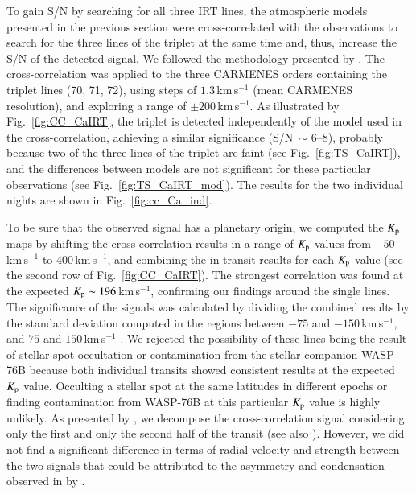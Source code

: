 \documentclass{aa}
\begin{document}
To gain S/N by searching for all three  IRT lines, the atmospheric models presented in the previous section were cross-correlated with the observations to search for the three lines of the  triplet at the same time and, thus, increase the S/N of the detected signal. We followed the methodology presented by \citet{Stangret2020}. The cross-correlation was applied to the three CARMENES orders containing the  triplet lines (70, 71, 72), using steps of $1.3$\,km\,s$^{-1}$ (mean CARMENES resolution), and exploring a range of $\pm200$\,km\,s$^{-1}$. As illustrated by Fig.~\ref{fig:CC_CaIRT}, %
the  triplet is detected independently of the model used in the cross-correlation, achieving a similar significance (S/N~$\sim$ 6--8), probably because two of the three lines of the triplet are faint (see Fig.~\ref{fig:TS_CaIRT}), and the differences between models are not significant for these particular observations (see Fig.~\ref{fig:TS_CaIRT_mod}). The results for the two individual nights are shown in Fig.~\ref{fig:cc_Ca_ind}. 

To be sure that the observed signal has a planetary origin, we computed the $K_{\rm p}$ maps by shifting the cross-correlation results in a range of $K_{\rm p}$ values from $-50$\,km\,s$^{-1}$ to $400$\,km\,s$^{-1}$, and combining the in-transit results for each $K_{\rm p}$ value (see the second row of Fig.~\ref{fig:CC_CaIRT}). The strongest correlation was found at the expected $K_{\rm p} \sim 196$\,km\,s$^{-1}$, confirming our findings around the single lines. The significance of the signals was calculated by dividing the combined results by the standard deviation computed in the regions between $-75$ and $-150$\,km\,s$^{-1}$, and $75$ and $150$\,km\,s$^{-1}$ \citep{birkby2017,SanchezLopez2019}. We rejected the possibility of these lines being the result of stellar spot occultation or contamination from the stellar companion WASP-76B because both individual transits showed consistent results at the expected $K_{\rm p}$ value. Occulting a stellar spot at the same latitudes in different epochs or finding contamination from WASP-76B at this particular $K_{\rm p}$ value is highly unlikely. As presented by \citet{Kesseli2021}, we decompose the  cross-correlation signal considering only the first and only the second half of the transit (see also \citealt{Wardenier2021}). However, we did not find a significant difference in terms of radial-velocity and strength between the two signals that could be attributed to the asymmetry and condensation observed in  by \citet{Ehrenreich2020}. 
\end{document}
